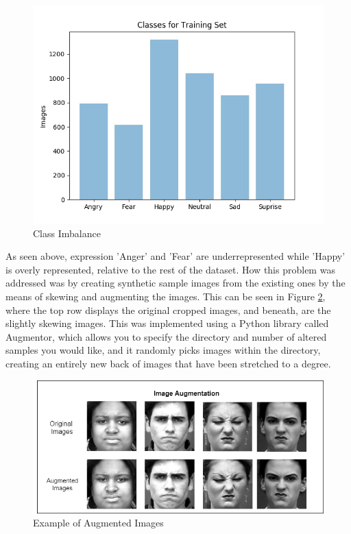 \begin{figure}[ht]
	\begin{center}
		\advance\leftskip-3cm
		\advance\rightskip-3cm
		\includegraphics[keepaspectratio=true,scale=0.6]{__resources/implementation/imbalance.jpg}
		\caption{Class Imbalance}
		\label{imbal}
	\end{center}
\end{figure}\newpage
As seen above, expression 'Anger' and 'Fear' are underrepresented while 'Happy' is overly represented, relative to the rest of the dataset. How this problem was addressed was by creating synthetic sample images from the existing ones by the means of skewing and augmenting the images. This can be seen in Figure \ref{augm}, where the top row displays the original cropped images, and beneath, are the slightly skewing images. This was implemented using a Python library called Augmentor, which allows you to specify the directory and number of altered samples you would like, and it randomly picks images within the directory, creating an entirely new back of images that have been stretched to a degree.
\begin{figure}[ht]
	\begin{center}
		\advance\leftskip-3cm
		\advance\rightskip-3cm
		\includegraphics[keepaspectratio=true,scale=0.6]{__resources/implementation/augmented-images.png}
		\caption{Example of Augmented Images}
		\label{augm}
	\end{center}
\end{figure}
\newpage

